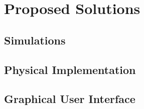 
\section{Proposed Solutions}

\subsection{Simulations}

\subsection{Physical Implementation}


\subsection{Graphical User Interface}

